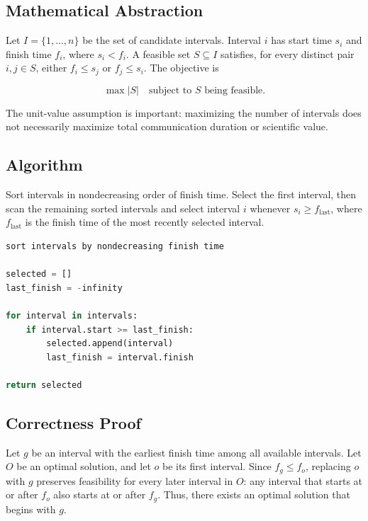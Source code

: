 \documentclass[conference]{IEEEtran}
\begin{document}
\subsection{Mathematical Abstraction}

Let $I=\{1,\ldots,n\}$ be the set of candidate intervals. Interval $i$
has start time $s_i$ and finish time $f_i$, where $s_i<f_i$. A feasible
set $S\subseteq I$ satisfies, for every distinct pair $i,j\in S$,
either $f_i\leq s_j$ or $f_j\leq s_i$. The objective is

\[
\max |S|
\quad \text{subject to } S \text{ being feasible}.
\]

The unit-value assumption is important: maximizing the number of
intervals does not necessarily maximize total communication duration
or scientific value.

\subsection{Algorithm}

Sort intervals in nondecreasing order of finish time. Select the first
interval, then scan the remaining sorted intervals and select interval
$i$ whenever $s_i\geq f_{\mathrm{last}}$, where
$f_{\mathrm{last}}$ is the finish time of the most recently selected
interval.

\newpage

\begin{lstlisting}[language=Python,caption={Earliest-finish-time greedy algorithm (pseudocode)}]
sort intervals by nondecreasing finish time

selected = []
last_finish = -infinity

for interval in intervals:
    if interval.start >= last_finish:
        selected.append(interval)
        last_finish = interval.finish

return selected
\end{lstlisting}

\subsection{Correctness Proof}

Let $g$ be an interval with the earliest finish time among all
available intervals. Let $O$ be an optimal solution, and let $o$ be
its first interval. Since $f_g\leq f_o$, replacing $o$ with $g$
preserves feasibility for every later interval in $O$: any interval
that starts at or after $f_o$ also starts at or after $f_g$.
Thus, there exists an optimal solution that begins with $g$.
\end{document}
